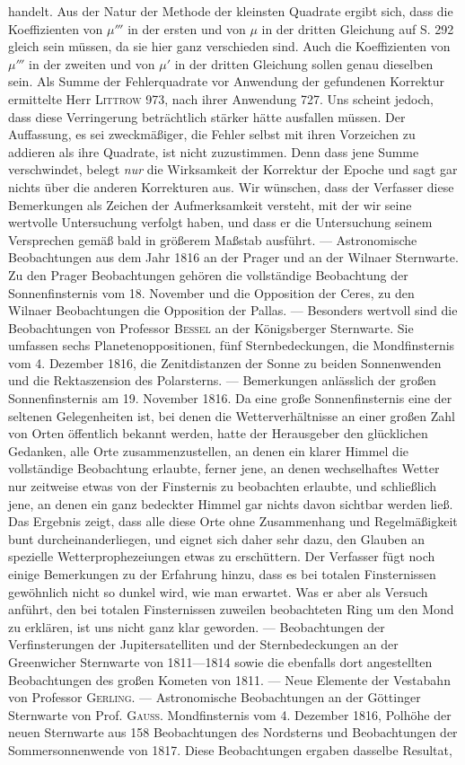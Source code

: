 handelt. Aus der Natur der Methode der kleinsten Quadrate ergibt sich, dass die Koeffizienten von $\mu'''$ in der ersten und von $\mu$ in der dritten Gleichung auf S. 292 gleich sein müssen, da sie hier ganz verschieden sind. Auch die Koeffizienten von $\mu'''$ in der zweiten und von $\mu'$ in der dritten Gleichung sollen genau dieselben sein. Als Summe der Fehlerquadrate vor Anwendung der gefundenen Korrektur ermittelte Herr \textsc{Littrow} 973, nach ihrer Anwendung 727. Uns scheint jedoch, dass diese Verringerung beträchtlich stärker hätte ausfallen müssen. Der Auffassung, es sei zweckmäßiger, die Fehler selbst mit ihren Vorzeichen zu addieren als ihre Quadrate, ist nicht zuzustimmen. Denn dass jene Summe verschwindet, belegt \emph{nur} die Wirksamkeit der Korrektur der Epoche und sagt gar nichts über die anderen Korrekturen aus. Wir wünschen, dass der Verfasser diese Bemerkungen als Zeichen der Aufmerksamkeit versteht, mit der wir seine wertvolle Untersuchung verfolgt haben, und dass er die Untersuchung seinem Versprechen gemäß bald in größerem Maßstab ausführt. --- Astronomische Beobachtungen aus dem Jahr 1816 an der Prager und an der Wilnaer Sternwarte. Zu den Prager Beobachtungen gehören die vollständige Beobachtung der Sonnenfinsternis vom 18. November und die Opposition der Ceres, zu den Wilnaer Beobachtungen die Opposition der Pallas. --- Besonders wertvoll sind die Beobachtungen von Professor \textsc{Bessel} an der Königsberger Sternwarte. Sie umfassen sechs Planetenoppositionen, fünf Sternbedeckungen, die Mondfinsternis vom 4. Dezember 1816, die Zenitdistanzen der Sonne zu beiden Sonnenwenden und die Rektaszension des Polarsterns. --- Bemerkungen anlässlich der großen Sonnenfinsternis am 19. November 1816. Da eine große Sonnenfinsternis eine der seltenen Gelegenheiten ist, bei denen die Wetterverhältnisse an einer großen Zahl von Orten öffentlich bekannt werden, hatte der Herausgeber den glücklichen Gedanken, alle Orte zusammenzustellen, an denen ein klarer Himmel die vollständige Beobachtung erlaubte, ferner jene, an denen wechselhaftes Wetter nur zeitweise etwas von der Finsternis zu beobachten erlaubte, und schließlich jene, an denen ein ganz bedeckter Himmel gar nichts davon sichtbar werden ließ. Das Ergebnis zeigt, dass alle diese Orte ohne Zusammenhang und Regelmäßigkeit bunt durcheinanderliegen, und eignet sich daher sehr dazu, den Glauben an spezielle Wetterprophezeiungen etwas zu erschüttern. Der Verfasser fügt noch einige Bemerkungen zu der Erfahrung hinzu, dass es bei totalen Finsternissen gewöhnlich nicht so dunkel wird, wie man erwartet. Was er aber als Versuch anführt, den bei totalen Finsternissen zuweilen beobachteten Ring um den Mond zu erklären, ist uns nicht ganz klar geworden. --- Beobachtungen der Verfinsterungen der Jupitersatelliten und der Sternbedeckungen an der Greenwicher Sternwarte von 1811---1814 sowie die ebenfalls dort angestellten Beobachtungen des großen Kometen von 1811. --- Neue Elemente der Vestabahn von Professor \textsc{Gerling}. --- Astronomische Beobachtungen an der Göttinger Sternwarte von Prof. \textsc{Gauss}. Mondfinsternis vom 4. Dezember 1816, Polhöhe der neuen Sternwarte aus 158 Beobachtungen des Nordsterns und Beobachtungen der Sommersonnenwende von 1817. Diese Beobachtungen ergaben dasselbe Resultat, 